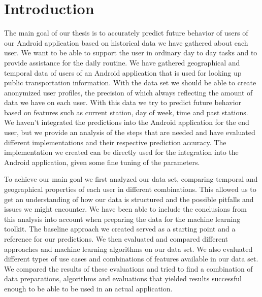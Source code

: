 \newpage
\chapter{Introduction}
The main goal of our thesis is to accurately predict future behavior of users of our Android application based on historical data we have gathered about each user. We want to be able to support the user in ordinary day to day tasks and to provide assistance for the daily routine. We have gathered geographical and temporal data of users of an Android application that is used for looking up public transportation information. With the data set we should be able to create anonymized user profiles, the precision of which always reflecting the amount of data we have on each user. With this data we try to predict future behavior based on features such as current station, day of week, time and past stations. We haven't integrated the predictions into the Android application for the end user, but we provide an analysis of the steps that are needed and have evaluated different implementations and their respective prediction accuracy. The implementation we created can be directly used for the integration into the Android application, given some fine tuning of the parameters.

To achieve our main goal we first analyzed our data set, comparing temporal and geographical properties of each user in different combinations. This allowed us to get an understanding of how our data is structured and the possible pitfalls and issues we might encounter. We have been able to include the conclusions from this analysis into account when preparing the data for the machine learning toolkit. The baseline approach we created served as a starting point and a reference for our predictions. We then evaluated and compared different approaches and machine learning algorithms on our data set. We also evaluated different types of use cases and combinations of features available in our data set. We compared the results of these evaluations and tried to find a combination of data preparations, algorithms and evaluations that yielded results successful enough to be able to be used in an actual application. 

